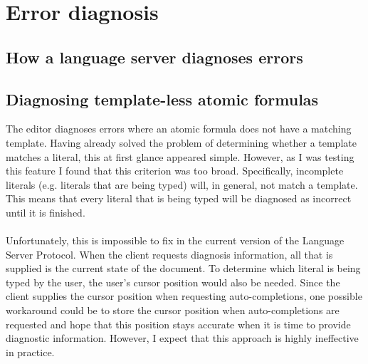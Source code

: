 \documentclass[../main.tex]{subfiles}
\begin{document}
\section{Error diagnosis}
\subsection{How a language server diagnoses errors}

\subsection{Diagnosing template-less atomic formulas}
The editor diagnoses errors where an atomic formula does not have a matching template. Having already solved the problem of determining whether a template matches a literal, this at first glance appeared simple.
However, as I was testing this feature I found that this criterion was too broad. Specifically, incomplete literals (e.g. literals that are being typed) will, in general, not match a template. This means that every literal that is being typed will be diagnosed as incorrect until it is finished. 
\\
\\
Unfortunately, this is impossible to fix in the current version of the Language Server Protocol. When the client requests diagnosis information, all that is supplied is the current state of the document. To determine which literal is being typed by the user, the user's cursor position would also be needed. Since the client supplies the cursor position when requesting auto-completions, one possible workaround could be to store the cursor position when auto-completions are requested and hope that this position stays accurate when it is time to provide diagnostic information. However, I expect that this approach is highly ineffective in practice.
\end{document}

